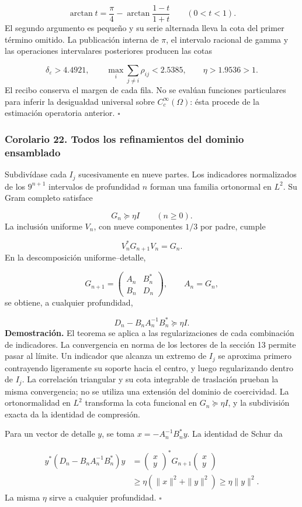 \[
\arctan t=\frac\pi4-
\arctan\frac{1-t}{1+t}\qquad(0<t<1).
\]
El segundo argumento es pequeño y su serie alternada lleva la cota del primer término omitido. La publicación interna de \(\pi\), el intervalo racional de gamma y las operaciones intervalares posteriores producen las cotas

\[
\delta_\varepsilon>4.4921,\qquad
\max_i\sum_{j\neq i}\rho_{ij}<2.5385,\qquad
\eta>1.9536>1.
\]
El recibo conserva el margen de cada fila. No se evalúan funciones particulares para inferir la desigualdad universal sobre \(C_c^\infty(\Omega)\): ésta procede de la estimación operatoria anterior. \hfill\(\square\)

\subsubsection*{Corolario 22. Todos los refinamientos del dominio ensamblado}
Subdivídase cada \(I_j\) sucesivamente en nueve partes. Los indicadores normalizados de los \(9^{n+1}\) intervalos de profundidad \(n\) forman una familia ortonormal en \(L^2\). Su Gram completo satisface

\[
G_n\succeq\eta I\qquad(n\geq0).
\]
La inclusión uniforme \(V_n\), con nueve componentes \(1/3\) por padre, cumple

\[
V_n^*G_{n+1}V_n=G_n.
\]
En la descomposición uniforme–detalle,

\[
G_{n+1}=\begin{pmatrix}A_n&B_n^*\\B_n&D_n\end{pmatrix},
\qquad A_n=G_n,
\]
se obtiene, a cualquier profundidad,

\[
\boxed{D_n-B_nA_n^{-1}B_n^*\succeq\eta I.}
\]
\textbf{Demostración.} El teorema se aplica a las regularizaciones de cada combinación de indicadores. La convergencia en norma de los lectores de la sección 13 permite pasar al límite. Un indicador que alcanza un extremo de \(I_j\) se aproxima primero contrayendo ligeramente su soporte hacia el centro, y luego regularizando dentro de \(I_j\). La correlación triangular y su cota integrable de traslación prueban la misma convergencia; no se utiliza una extensión del dominio de coercividad. La ortonormalidad en \(L^2\) transforma la cota funcional en \(G_n\succeq\eta I\), y la subdivisión exacta da la identidad de compresión.

Para un vector de detalle \(y\), se toma \(x=-A_n^{-1}B_n^*y\). La identidad de Schur da

\[
\begin{aligned}
y^*(D_n-B_nA_n^{-1}B_n^*)y
&=\begin{pmatrix}x\\y\end{pmatrix}^*G_{n+1}
\begin{pmatrix}x\\y\end{pmatrix}\\
&\geq\eta(\|x\|^2+\|y\|^2)\geq\eta\|y\|^2.
\end{aligned}
\]
La misma \(\eta\) sirve a cualquier profundidad. \hfill\(\square\)

